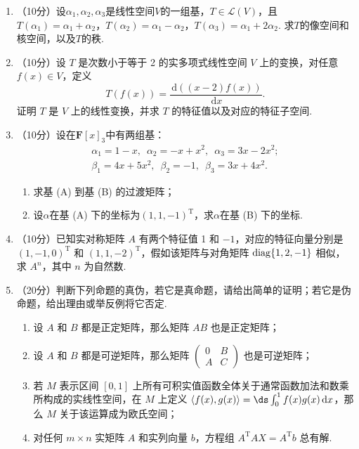 \begin{enumerate}
    \item （10分）设$\alpha_1,\alpha_2,\alpha_3$是线性空间$V$的一组基，$T\in\mathcal{L}(V)$，且$T(\alpha_1)=\alpha_1+\alpha_2$，$T(\alpha_2)=\alpha_1-\alpha_2$，$T(\alpha_3)=\alpha_1+2\alpha_2$. 求$T$的像空间和核空间，以及$T$的秩.

    \item （10分）设 $T$ 是次数小于等于 2 的实多项式线性空间 $V$ 上的变换，对任意 $f(x) \in V$，定义
    \[T(f(x))=\frac{\,\mathrm{d}((x-2)f(x))}{\,\mathrm{d}x}.\]
    证明 $T$ 是 $V$ 上的线性变换，并求 $T$ 的特征值以及对应的特征子空间.

    \item （10分）设在$\mathbf{F}[x]_3$中有两组基：
    \begin{gather}
        \alpha_1=1-x,\enspace\alpha_2=-x+x^2,\enspace\alpha_3=3x-2x^2; \tag{A} \\
        \beta_1=4x+5x^2,\enspace\beta_2=-1,\enspace\beta_3=3x+4x^2. \tag{B}
    \end{gather}
    \begin{enumerate}
        \item 求基 (A) 到基 (B) 的过渡矩阵；

        \item 设$\alpha$在基 (A) 下的坐标为$(1,1,-1)^{\mathrm{T}}$，求$\alpha$在基 (B) 下的坐标.
    \end{enumerate}

    \item （10分）已知实对称矩阵 $A$ 有两个特征值 1 和 $-1$，对应的特征向量分别是 $(1,-1,0)^\mathrm{T}$ 和 $(1,1,-2)^\mathrm{T}$，假如该矩阵与对角矩阵 $\operatorname{diag}\{1,2,-1\}$ 相似，求 $A^n$，其中 $n$ 为自然数.
    \item （20分）判断下列命题的真伪，若它是真命题，请给出简单的证明；若它是伪命题，给出理由或举反例将它否定.
    \begin{enumerate}
        \item 设 $A$ 和 $B$ 都是正定矩阵，那么矩阵 $AB$ 也是正定矩阵；

        \item 设 $A$ 和 $B$ 都是可逆矩阵，那么矩阵 $\begin{pmatrix}0 & B \\ A & C\end{pmatrix}$ 也是可逆矩阵；

        \item 若 $M$ 表示区间 $[0,1]$ 上所有可积实值函数全体关于通常函数加法和数乘所构成的实线性空间，在 $M$ 上定义 $\langle f(x), g(x)\rangle=\ds\int_0^1f(x)g(x)\,\mathrm{d}x$，那么 $M$ 关于该运算成为欧氏空间；

        \item 对任何 $m \times n$ 实矩阵 $A$ 和实列向量 $b$，方程组 $A^\mathrm{T}AX=A^\mathrm{T}b$ 总有解.
    \end{enumerate}
\end{enumerate}

\clearpage
